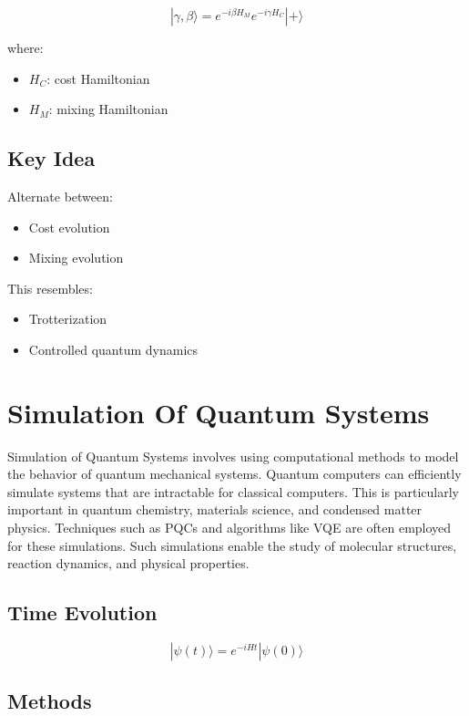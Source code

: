 \[
|\gamma, \beta\rangle = e^{-i\beta H_M} e^{-i\gamma H_C} |+\rangle
\]

where:
\begin{itemize}
\item $H_C$: cost Hamiltonian
\item $H_M$: mixing Hamiltonian
\end{itemize}

\subsection*{Key Idea}

Alternate between:
\begin{itemize}
\item Cost evolution
\item Mixing evolution
\end{itemize}

This resembles:
\begin{itemize}
\item Trotterization
\item Controlled quantum dynamics
\end{itemize}

\vspace{0.5cm}

\section{Simulation Of Quantum Systems}

Simulation of Quantum Systems involves using computational methods to model the behavior of quantum mechanical systems.
Quantum computers can efficiently simulate systems that are intractable for classical computers.
This is particularly important in quantum chemistry, materials science, and condensed matter physics.
Techniques such as PQCs and algorithms like VQE are often employed for these simulations.
Such simulations enable the study of molecular structures, reaction dynamics, and physical properties.

\subsection*{Time Evolution}

\[
|\psi(t)\rangle = e^{-iHt} |\psi(0)\rangle
\]

\subsection*{Methods}

